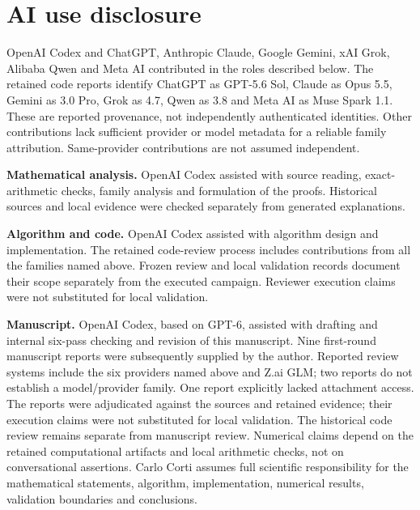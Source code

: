 \documentclass[11pt]{article}
\theoremstyle{definition}
\begin{document}
\section*{AI use disclosure}
OpenAI Codex and ChatGPT, Anthropic Claude, Google Gemini, xAI Grok,
Alibaba Qwen and Meta AI contributed in the roles described below.
The retained code reports identify ChatGPT as GPT-5.6 Sol, Claude as
Opus 5.5, Gemini as 3.0 Pro, Grok as 4.7, Qwen as 3.8 and Meta AI as
Muse Spark 1.1. These are reported provenance, not independently
authenticated identities. Other contributions lack sufficient provider or
model metadata for a reliable family attribution. Same-provider
contributions are not assumed independent.

\noindent\textbf{Mathematical analysis.}
OpenAI Codex assisted with source reading, exact-arithmetic checks,
family analysis and formulation of the proofs. Historical sources and
local evidence were checked separately from generated explanations.

\noindent\textbf{Algorithm and code.}
OpenAI Codex assisted with algorithm design and implementation. The
retained code-review process includes contributions from all the families
named above. Frozen review and local validation records document their
scope separately from the executed campaign.
Reviewer execution claims were not substituted for local validation.

\noindent\textbf{Manuscript.}
OpenAI Codex, based on GPT-6, assisted with drafting and internal
six-pass checking and revision of this manuscript. Nine first-round
manuscript reports were subsequently supplied by the author. Reported
review systems include the six providers named above and Z.ai GLM;
two reports do not establish a model/provider family. One report
explicitly lacked attachment access. The reports were adjudicated against
the sources and retained evidence; their execution claims were not
substituted for local validation. The historical code review remains
separate from manuscript review. Numerical claims depend on the retained computational
artifacts and local arithmetic checks, not on conversational assertions.
Carlo Corti assumes full scientific responsibility for the mathematical
statements, algorithm, implementation, numerical results, validation boundaries
and conclusions.
\end{document}
